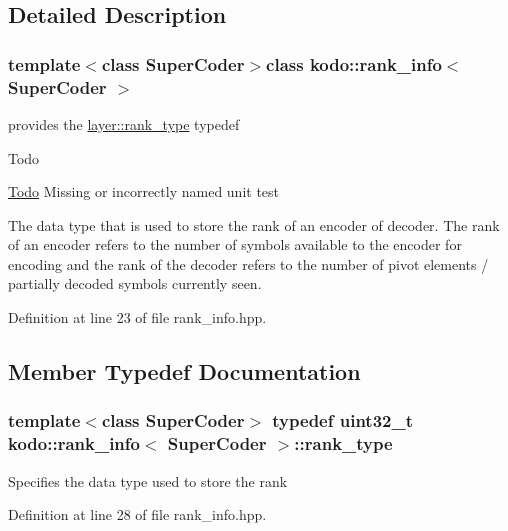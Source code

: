 \subsection{Detailed Description}
\subsubsection*{template$<$class Super\-Coder$>$class kodo\-::rank\-\_\-info$<$ Super\-Coder $>$}

provides the \hyperlink{classlayer_a1de820b75c9af3faf024dee2b22599e4}{layer\-::rank\-\_\-type} typedef 

\begin{DoxyRefDesc}{Todo}
\item[\hyperlink{todo__todo000042}{Todo}]Missing or incorrectly named unit test\end{DoxyRefDesc}
The data type that is used to store the rank of an encoder of decoder. The rank of an encoder refers to the number of symbols available to the encoder for encoding and the rank of the decoder refers to the number of pivot elements / partially decoded symbols currently seen. 

Definition at line 23 of file rank\-\_\-info.\-hpp.



\subsection{Member Typedef Documentation}
\hypertarget{classkodo_1_1rank__info_a12ba3fbad23b26891e45ba55b48a1073}{
\subsubsection[{rank\-\_\-type}]{\setlength{\rightskip}{0pt plus 5cm}template$<$class Super\-Coder$>$ typedef uint32\-\_\-t {\bf kodo\-::rank\-\_\-info}$<$ Super\-Coder $>$\-::{\bf rank\-\_\-type}}}\label{classkodo_1_1rank__info_a12ba3fbad23b26891e45ba55b48a1073}




Specifies the data type used to store the rank 

Definition at line 28 of file rank\-\_\-info.\-hpp.



